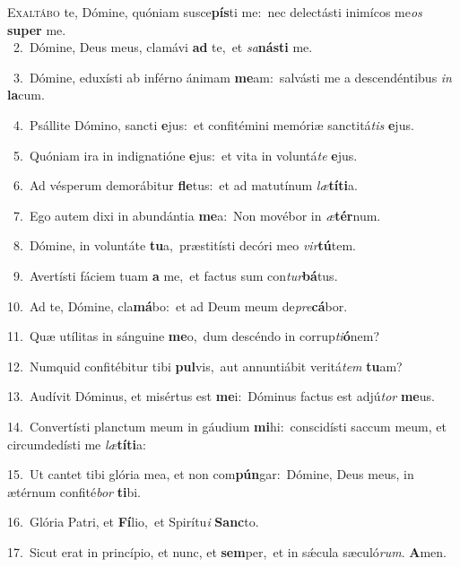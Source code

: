 \lettrine{\initial\textcolor{\initialcolor}{E}}{xaltábo} te, Dómine, quóniam susce\-\textbf{pís}\-ti me:~\star nec delectásti inimícos me\textit{os} \textbf{su}\-\textbf{per} me.\\
{\numbfont\textcolor{\numbcolor}{~2.}}~Dómine, Deus meus, clamávi \textbf{ad} te,~\star et \textit{sa}\-\textbf{nás}\textbf{ti} me.\par
{\numbfont\textcolor{\numbcolor}{~3.}}~Dómine, eduxísti ab inférno ánimam \textbf{me}\-am:~\star salvásti me a descendéntibus \textit{in} \textbf{la}\-cum.\par
{\numbfont\textcolor{\numbcolor}{~4.}}~Psállite Dómino, sancti \textbf{e}\-jus:~\star et confitémini memóriæ sanctitá\textit{tis} \textbf{e}\-jus.\par
{\numbfont\textcolor{\numbcolor}{~5.}}~Quóniam ira in indignatióne \textbf{e}\-jus:~\star et vita in voluntá\textit{te} \textbf{e}\-jus.\par
{\numbfont\textcolor{\numbcolor}{~6.}}~Ad vésperum demorábitur \textbf{fle}\-tus:~\star et ad matutínum \textit{læ}\-\textbf{tí}\textbf{ti}a.\par
{\numbfont\textcolor{\numbcolor}{~7.}}~Ego autem dixi in abundántia \textbf{me}\-a:~\star Non movébor in \textit{æ}\-\textbf{tér}num.\par
{\numbfont\textcolor{\numbcolor}{~8.}}~Dómine, in voluntáte \textbf{tu}\-a,~\star præstitísti decóri meo \textit{vir}\-\textbf{tú}tem.\par
{\numbfont\textcolor{\numbcolor}{~9.}}~Avertísti fáciem tuam \textbf{a} me,~\star et factus sum con\-\textit{tur}\-\textbf{bá}tus.\par
{\numbfont\textcolor{\numbcolor}{10.}}~Ad te, Dómine, cla\-\textbf{má}\-bo:~\star et ad Deum meum de\-\textit{pre}\-\textbf{cá}bor.\par
{\numbfont\textcolor{\numbcolor}{11.}}~Quæ utílitas in sánguine \textbf{me}\-o,~\star dum descéndo in corrup\-\textit{ti}\-\textbf{ó}nem?\par
{\numbfont\textcolor{\numbcolor}{12.}}~Numquid confitébitur tibi \textbf{pul}\-vis,~\star aut annuntiábit veritá\textit{tem} \textbf{tu}\-am?\par
{\numbfont\textcolor{\numbcolor}{13.}}~Audívit Dóminus, et misértus est \textbf{me}\-i:~\star Dóminus factus est adjú\textit{tor} \textbf{me}\-us.\par
{\numbfont\textcolor{\numbcolor}{14.}}~Convertísti planctum meum in gáudium \textbf{mi}\-hi:~\star conscidísti saccum meum, et circumdedísti me \textit{læ}\-\textbf{tí}\textbf{ti}a:\par
{\numbfont\textcolor{\numbcolor}{15.}}~Ut cantet tibi glória mea, et non com\-\textbf{pún}\-gar:~\star Dómine, Deus meus, in ætérnum confité\textit{bor} \textbf{ti}\-bi.\par
{\numbfont\textcolor{\numbcolor}{16.}}~Glória Patri, et \textbf{Fí}\-lio,~\star et Spirítu\textit{i} \textbf{Sanc}\-to.\par
{\numbfont\textcolor{\numbcolor}{17.}}~Sicut erat in princípio, et nunc, et \textbf{sem}\-per,~\star et in sǽcula sæculó\-\textit{rum}\-. \textbf{A}\-men.\par
